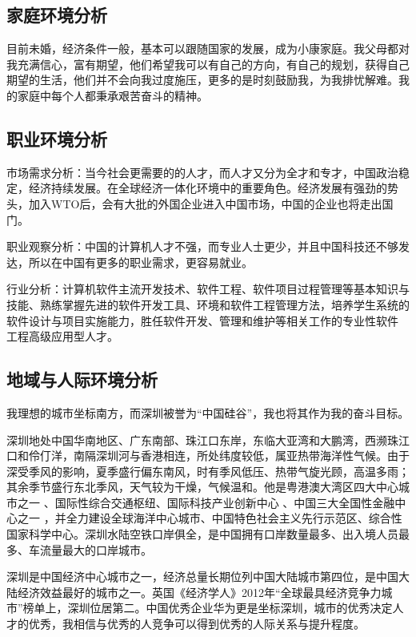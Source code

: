 \documentclass{article}
\begin{document}
\subsection{家庭环境分析}
目前未婚，经济条件一般，基本可以跟随国家的发展，成为小康家庭。我父母都对我充满信心，富有期望，他们希望我可以有自己的方向，有自己的规划，获得自己期望的生活，他们并不会向我过度施压，更多的是时刻鼓励我，为我排忧解难。我的家庭中每个人都秉承艰苦奋斗的精神。\par
\subsection{职业环境分析}
市场需求分析：当今社会更需要的的人才，而人才又分为全才和专才，中国政治稳定，经济持续发展。在全球经济一体化环境中的重要角色。经济发展有强劲的势头，加入WTO后，会有大批的外国企业进入中国市场，中国的企业也将走出国门。\par
职业观察分析：中国的计算机人才不强，而专业人士更少，并且中国科技还不够发达，所以在中国有更多的职业需求，更容易就业。\par
行业分析：计算机软件主流开发技术、软件工程、软件项目过程管理等基本知识与技能、熟练掌握先进的软件开发工具、环境和软件工程管理方法，培养学生系统的软件设计与项目实施能力，胜任软件开发、管理和维护等相关工作的专业性软件
工程高级应用型人才。\par


\subsection{地域与人际环境分析}
我理想的城市坐标南方，而深圳被誉为“中国硅谷”，我也将其作为我的奋斗目标。\par
深圳地处中国华南地区、广东南部、珠江口东岸，东临大亚湾和大鹏湾，西濒珠江口和伶仃洋，南隔深圳河与香港相连，所处纬度较低，属亚热带海洋性气候。由于深受季风的影响，夏季盛行偏东南风，时有季风低压、热带气旋光顾，高温多雨；其余季节盛行东北季风，天气较为干燥，气候温和。他是粤港澳大湾区四大中心城市之一 、国际性综合交通枢纽、国际科技产业创新中心 、中国三大全国性金融中心之一 ，并全力建设全球海洋中心城市、中国特色社会主义先行示范区、综合性国家科学中心。深圳水陆空铁口岸俱全，是中国拥有口岸数量最多、出入境人员最多、车流量最大的口岸城市。\par
深圳是中国经济中心城市之一，经济总量长期位列中国大陆城市第四位，是中国大陆经济效益最好的城市之一。英国《经济学人》2012年“全球最具经济竞争力城市”榜单上，深圳位居第二。中国优秀企业华为更是坐标深圳，城市的优秀决定人才的优秀，我相信与优秀的人竞争可以得到优秀的人际关系与提升程度。\par 
\end{document}
